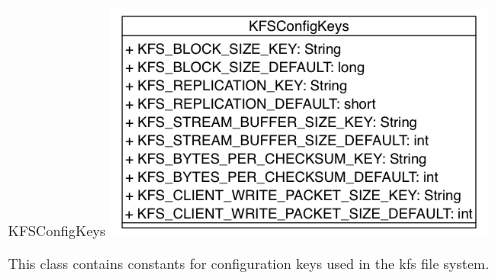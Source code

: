 \begin{XeClass}{KFSConfigKeys}
\includegraphics[width=10cm]{cdig/KFSConfigKeys.png}
     
 This class contains constants for configuration keys used
 in the kfs file system. 

\end{XeClass}
